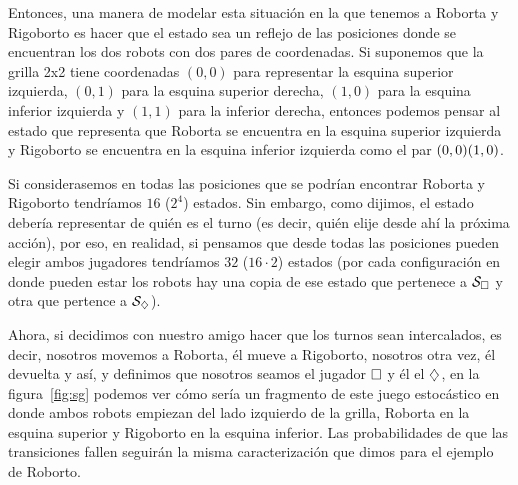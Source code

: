 Entonces, una manera de modelar esta situación en la que tenemos a Roborta y
Rigoborto es hacer que el estado sea un reflejo de las posiciones donde se
encuentran los dos robots con dos pares de coordenadas. Si suponemos que la
grilla 2x2 tiene coordenadas $(0,0)$ para representar la esquina superior
izquierda, $(0,1)$ para la esquina superior derecha, $(1,0)$ para la esquina
inferior izquierda y $(1,1)$ para la inferior derecha, entonces podemos pensar
al estado que representa que Roborta se encuentra en la esquina superior
izquierda y Rigoborto se encuentra en la esquina inferior izquierda como el par
$(0,0) \\ (1,0)$.

Si considerasemos en todas las posiciones que se podrían encontrar Roborta y
Rigoborto tendríamos $16$ ($2^4$) estados. Sin embargo, como dijimos, el estado
debería representar de quién es el turno (es decir, quién elije desde ahí la
próxima acción), por eso, en realidad, si pensamos que desde todas las
posiciones pueden elegir ambos jugadores tendríamos $32$ ($16 \cdot 2$) estados
(por cada configuración en donde pueden estar los robots hay una copia de ese
estado que pertenece a $\mathcal{S}_\square$ y otra que pertence a $\mathcal{S}_\diamondsuit$).

Ahora, si decidimos con nuestro amigo hacer que los turnos sean intercalados,
es decir, nosotros movemos a Roborta, él mueve a Rigoborto, nosotros otra vez,
él devuelta y así, y definimos que nosotros seamos el jugador $\square$ y él el
$\diamondsuit$, en la figura~\ref{fig:sg} podemos ver cómo sería un fragmento de este
juego estocástico en donde ambos robots empiezan del lado izquierdo de la
grilla, Roborta en la esquina superior y Rigoborto en la esquina inferior. Las
probabilidades de que las transiciones fallen seguirán la misma caracterización
que dimos para el ejemplo de Roborto.

